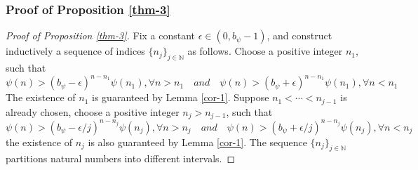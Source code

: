 \documentclass[12pt,reqno]{amsart}
\renewcommand{\=}{\coloneqq}
\theoremstyle{plain}
\begin{document}
	
\subsubsection{Proof of Proposition \ref{thm-3}}
\begin{proof}[Proof of Proposition \ref{thm-3}]
Fix a constant $\epsilon\in (0,b_{\psi}-1)$, and construct inductively a sequence of indices $\{n_j\}_{j\in\mathbb{N}}$ as follows. Choose a positive integer $n_1$, such that
\begin{equation*}
\psi(n)>(b_{\psi}-\epsilon)^{n-n_1} \psi(n_1), \forall n>n_1 \quad and \quad \psi(n) > (b_{\psi}+\epsilon)^{n-n_1} \psi(n_1), \forall n < n_1
\end{equation*}
The existence of $n_1$ is guaranteed by Lemma \ref{cor-1}. Suppose $n_1<\cdots<n_{j-1}$ is already chosen, choose a positive integer $n_j > n_{j-1}$, such that
\begin{equation}\label{equ-a}
\psi(n)>(b_{\psi}-\epsilon/j)^{n-n_j} \psi(n_j), \forall n>n_j \quad and \quad \psi(n) > (b_{\psi}+\epsilon/j)^{n-n_j} \psi(n_j), \forall n < n_j
\end{equation}
the existence of $n_j$ is also guaranteed by Lemma \ref{cor-1}. The sequence $\{n_j\}_{j\in\mathbb{N}}$ partitions natural numbers into different intervals.


\end{proof}
\end{document}
